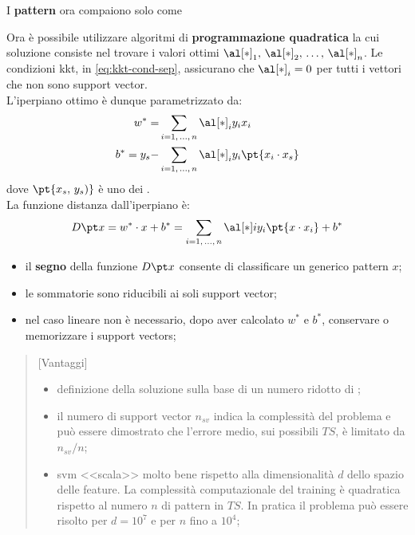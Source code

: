 \begin{note}
    I \textbf{pattern} ora compaiono solo come 
\end{note}
\emptyln{}
Ora è possibile utilizzare algoritmi di \textbf{programmazione quadratica} la cui soluzione consiste nel trovare i valori ottimi $\al[*]_1,\,\al[*]_2,\,\dots,\,\al[*]_n$.
Le condizioni \ac{kkt}, in \cref{eq:kkt-cond-sep}, assicurano che $\al[*]_i = 0$ per tutti i vettori che non sono support vector.
\\
L'iperpiano ottimo è dunque parametrizzato da:
\[
    \begin{aligned}
        w^* = &\sum_{i = 1,\,\dots,\,n}{\al[*]_iy_ix_i} \\
        b^* = y_s - &\sum_{i = 1,\,\dots,\,n}{\al[*]_iy_i\pt{x_i\cdot x_s}}
    \end{aligned}
\]
dove $\pt{x_s,\,y_s)}$ è uno dei .
\\
La funzione distanza dall'iperpiano è:
\[
    D\pt x = w^* \cdot x + b^* = \sum_{i = 1,\,\dots,\,n}{\al[*]iy_i\pt{x\cdot x_i} + b^*}
\]
\begin{note}
    \begin{itemize}
        \item il \textbf{segno} della funzione $D\pt x$ consente di classificare un generico pattern $x$;
        \item le sommatorie sono riducibili ai soli support vector;
        \item nel caso lineare non è necessario, dopo aver calcolato $w^*$ e $b^*$, conservare o memorizzare i support vectors;
    \end{itemize}
\end{note}
\begin{quote}[Vantaggi]{}
    \begin{itemize}
        \item definizione della soluzione sulla base di un numero ridotto di ;
        \item il numero di support vector $n_{sv}$ indica la complessità del problema e può essere dimostrato che l'errore medio, sui possibili $TS$, è limitato da $n_{sv}/n$;
        \item \ac{svm} <<scala>> molto bene rispetto alla dimensionalità $d$ dello spazio delle feature.
            La complessità computazionale del training è quadratica rispetto al numero $n$ di pattern in $TS$.
            In pratica il problema può essere risolto per $d = 10^7$ e per $n$ fino a $10^4$;
    \end{itemize}
\end{quote}
%
